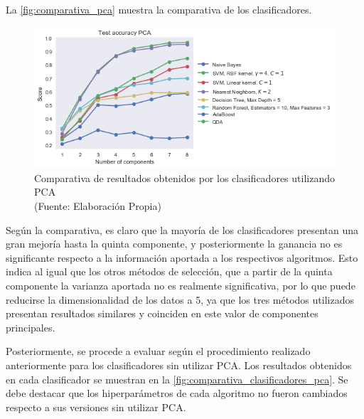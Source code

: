 La \autoref{fig:comparativa_pca} muestra la comparativa de los clasificadores.

\begin{figure}[ht!]
\centering
\includegraphics[width=.6\textwidth]{figures/comparativa_clasificadores_pca.png}
\caption[Comparativa de resultados obtenidos por los clasificadores utilizando PCA]{Comparativa de resultados obtenidos por los clasificadores utilizando PCA  \\
{\scriptsize (Fuente: Elaboración Propia)}}
\label{fig:comparativa_pca}
\end{figure}

Según la comparativa, es claro que la mayoría de los clasificadores presentan una gran mejoría hasta la quinta componente, y posteriormente la ganancia no es significante respecto a la información aportada a los respectivos algoritmos. Esto indica al igual que los otros métodos de selección, que a partir de la quinta componente la varianza aportada no es realmente significativa, por lo que puede reducirse la dimensionalidad de los datos a 5, ya que los tres métodos utilizados presentan resultados similares y coinciden en este valor de componentes principales.

Posteriormente, se procede a evaluar según el procedimiento realizado anteriormente para los clasificadores sin utilizar PCA. Los resultados obtenidos en cada clasificador se muestran en la \autoref{fig:comparativa_clasificadores_pca}. Se debe destacar que los hiperparámetros de cada algoritmo no fueron cambiados respecto a sus versiones sin utilizar PCA.


